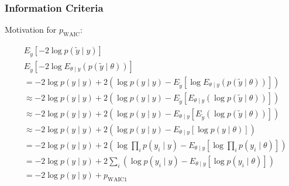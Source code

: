 \documentclass{beamer}
\begin{document}
\begin{frame}
\frametitle{Information Criteria}

Motivation for $p_{\text{WAIC}}$:

\begin{align*}
&E_{\tilde{y}}\left[ -2  \log   p(\tilde{y} \mid y)  \right] \\
&E_{\tilde{y}}\left[ -2  \log  E_{\theta \mid y} ( p(\tilde{y} \mid \theta) ) \right] \\
&= - 2\log p(y \mid y) + 2\left( \log p(y \mid y) - E_{\tilde{y}}\left[  \log  E_{\theta \mid y} ( p(\tilde{y} \mid \theta) ) \right] \right) \\
&\approx - 2\log p(y \mid y) + 2\left( \log p(y \mid y) - E_{\tilde{y}}\left[   E_{\theta \mid y} ( \log  p(\tilde{y} \mid \theta) ) \right] \right) \\
&\approx - 2\log p(y \mid y) + 2\left( \log p(y \mid y) - E_{\theta \mid y}\left[   E_{\tilde{y}} (\log  p(\tilde{y} \mid \theta) ) \right] \right) \\
&\approx - 2\log p(y \mid y) + 2\left( \log p(y \mid y) - E_{\theta \mid y}\left[  \log   p(y \mid \theta)  \right] \right) \\
&= - 2\log p(y \mid y) + 2\left( \log \prod_i p(y_i \mid y) - E_{\theta \mid y}\left[  \log   \prod_i p(y_i \mid \theta)  \right] \right) \\
&= - 2\log p(y \mid y) + 2 \sum_i \left(  \log p(y_i \mid y) - E_{\theta \mid y}\left[ \log p(y_i \mid \theta)  \right] \right) \\
&= - 2\log p(y \mid y) + p_{\text{WAIC} 1}
\end{align*}



\end{frame}
\end{document}
